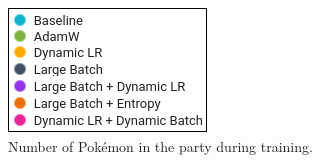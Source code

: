 \documentclass[10pt,conference]{IEEEtran}
\begin{document}
\begin{figure}[htbp]
  \centering
  \begin{minipage}[b]{\textwidth}
    \centering
  \end{minipage}
  \hfill
  \begin{minipage}[b]{\textwidth}
    \centering
    \includegraphics{figs/legend.png}
    \caption{Number of Pokémon in the party during training.}
    \label{fig:pcount}
  \end{minipage}
\end{figure}
\end{document}
